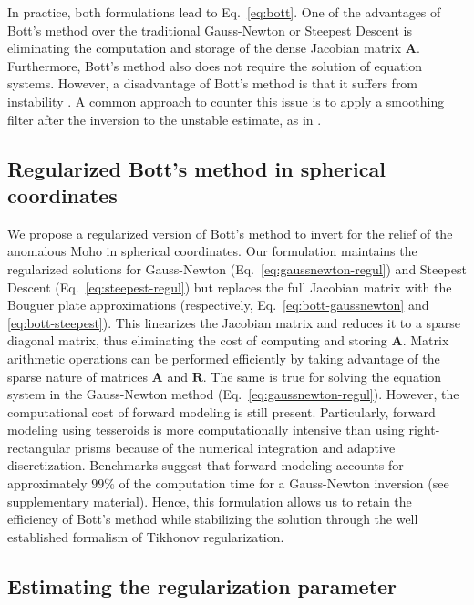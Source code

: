 \documentclass[extra,mreferee]{gji}
\begin{document}
\noindent
In practice, both formulations lead to Eq.~\ref{eq:bott}.
One of the advantages of Bott's method over the traditional Gauss-Newton or
Steepest Descent is eliminating the computation and storage of the dense
Jacobian matrix $\mathbf{A}$.
Furthermore, Bott's method also does not require the solution of equation
systems.
However, a disadvantage of Bott's method is that it suffers from instability
\citep{silva2014}.
A common approach to counter this issue is to apply a smoothing filter after
the inversion to the unstable estimate, as in \citet{silva2014}.



\subsection{Regularized Bott's method in spherical coordinates}

We propose a regularized version of Bott's method to invert for the relief of
the anomalous Moho in spherical coordinates.
Our formulation maintains the regularized solutions
for Gauss-Newton (Eq.~\ref{eq:gaussnewton-regul}) and
Steepest Descent (Eq.~\ref{eq:steepest-regul})
but replaces the full Jacobian matrix with the Bouguer plate approximations
(respectively, Eq.~\ref{eq:bott-gaussnewton} and \ref{eq:bott-steepest}).
This linearizes the Jacobian matrix and reduces it to a sparse diagonal matrix,
thus eliminating the cost of computing and storing $\mathbf{A}$.
Matrix arithmetic operations can be performed efficiently by taking advantage
of the sparse nature of matrices $\mathbf{A}$ and $\mathbf{R}$.
The same is true for solving the equation system in the Gauss-Newton method
(Eq.~\ref{eq:gaussnewton-regul}).
However, the computational cost of forward modeling is still present.
Particularly, forward modeling using tesseroids is more computationally
intensive than using right-rectangular prisms
because of the numerical integration and adaptive discretization.
Benchmarks suggest that
forward modeling accounts for approximately $99\%$
of the computation time for a Gauss-Newton inversion
(see supplementary material).
Hence, this formulation allows us to retain the efficiency of Bott's method
while stabilizing the solution through the well established formalism of
Tikhonov regularization.



\subsection{Estimating the regularization parameter}
\end{document}
